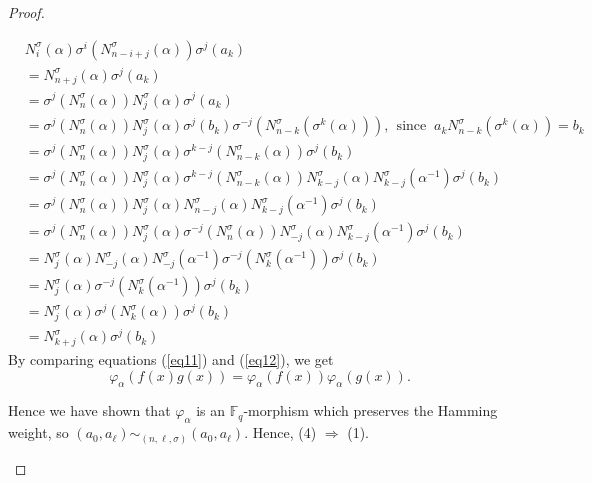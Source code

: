 \documentclass[12pt,paper]{article}
\newcommand{\hlc}[2][yellow]{ {\sethlcolor{#1} \hl{#2}} }
\theoremstyle{plain}
\begin{document}
\begin{proof}
\begin{itemize}
$$ 
\begin{array}{rl}
& N_i^\sigma(\alpha)\sigma^i(N_{n-i+j}^\sigma(\alpha))  \sigma^j(a_{k})   \\
 & = N_{n+j}^{\sigma}(\alpha)  \sigma^j(a_{k})  \\
  &=  \sigma^{ j} ( N^{\sigma}_{n}(\alpha)) N^{\sigma}_j(\alpha)  \sigma^{ j}(a_{k}) \\
  &= \sigma^{ j} ( N^{\sigma}_{n}(\alpha))  N^{\sigma}_j(\alpha) \sigma^{ j} (b_{k}) \sigma^{ -j} ( N^{\sigma}_{n-k}(\sigma^{k}(\alpha))), \ \ 
  \text{since } \ 
  a_{k}  N^{\sigma}_{n-k}(\sigma^{k}(\alpha))  = b_{k}\\
  &= \sigma^{ j} ( N^{\sigma}_{n}(\alpha)) N^{\sigma}_{j}(\alpha)   \sigma^{ k-j} ( N^{\sigma}_{n-k}(  \alpha)) \sigma^{ j} (b_{k}) \\
&=  \sigma^{ j} ( N^{\sigma}_{n}(\alpha)) N^{\sigma}_{j}(\alpha)   \sigma^{ k-j} ( N^{\sigma}_{n-k}(  \alpha))     N_{k-j}^{\sigma}(\alpha)  N_{k-j}^{\sigma}(\alpha^{-1}) \sigma^{ j} (b_{k})   \\ 
&=  \sigma^{ j} ( N^{\sigma}_{n}(\alpha)) N^{\sigma}_{j}(\alpha)   N_{n-j}^{\sigma}(\alpha) N_{k-j}^{\sigma}(\alpha^{-1}) \sigma^{ j} (b_{k})   \\ 
&=  \sigma^{ j} ( N^{\sigma}_{n}(\alpha)) N^{\sigma}_{j}(\alpha)  \sigma^{-j}(N_n^{\sigma}(\alpha)) N_{-j}^{\sigma}(\alpha) N_{k-j}^{\sigma}(\alpha^{-1}) \sigma^{ j} (b_{k})   \\ 
&=   N^{\sigma}_{j}(\alpha)  N_{-j}^{\sigma}(\alpha) N^{\sigma}_{-j}(\alpha^{-1}) \sigma^{-j}(N^{\sigma}_{k}(\alpha^{-1})) \sigma^{ j} (b_{k})   \\ 
&=   N^{\sigma}_{j}(\alpha)  \sigma^{-j}(N^{\sigma}_{k}(\alpha^{-1})) \sigma^{ j} (b_{k})   \\ 
 & =N^{\sigma}_{j}(\alpha)  \sigma^{j}(N^{\sigma}_{k}(\alpha)) \sigma^{ j} (b_{k})   \\ 
 & =N^{\sigma}_{k+j}(\alpha)  \sigma^{ j} (b_{k})   
\end{array}
$$
By comparing equations  (\ref{eq11}) and  (\ref{eq12}), we get 
$$
\varphi_\alpha(f(x)g(x)) = \varphi_\alpha(f(x))\varphi_\alpha(g(x)).
$$

Hence we have shown that $\varphi_\alpha$ is an $\mathbb{F}_q$-morphism which preserves the Hamming weight,  so
$(a_0, a_{\ell}) \sim_{(n,\ell,\sigma)} (a_0, a_{\ell}).$ Hence,  (4) $\Rightarrow$ (1).
\end{itemize}


\end{proof}
\end{document}
